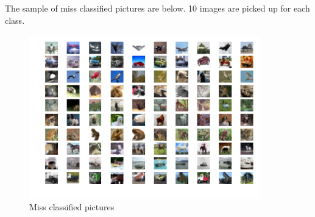 The sample of miss classified pictures are below. 10 images are picked up for each class.

\begin{figure}[H]

	\begin{center}
	\includegraphics[width=10cm]{picture/miss_classified_pic.png}
	\caption{Miss classified pictures}
	\end{center}
	\label{fig:18}

\end{figure}
